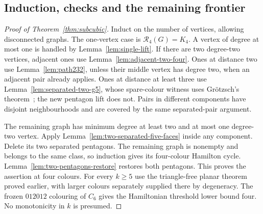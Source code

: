 \documentclass[11pt]{article}
\theoremstyle{remark}
\newcommand{\R}{\mathcal R}
\numberwithin{equation}{section}
\numberwithin{table}{section}
\begin{document}
\subsection{Induction, checks and the remaining frontier}
\begin{proof}[Proof of Theorem~\ref{thm:subcubic}]
Induct on the number of vertices, allowing disconnected graphs.
The one-vertex case is $\R_4(G)=K_4$. A vertex of degree at most one
is handled by Lemma~\ref{lem:single-lift}.
If there are two degree-two vertices, adjacent ones use Lemma~\ref{lem:adjacent-two-four}. Ones at distance two use Lemma~\ref{lem:path232}, unless their
middle vertex has degree two, when an adjacent pair already applies.
Ones at distance at least three use Lemma~\ref{lem:separated-two-g5}, whose spare-colour witness uses
Gr\"otzsch's theorem~\cite{Grotzsch59}; the new pentagon lift does not.
Pairs in different components have disjoint neighbourhoods and
are covered by the same separated-pair argument.

The remaining graph has minimum degree at least two and at most
one degree-two vertex. Apply Lemma~\ref{lem:two-separated-five-faces}
inside any component. Delete its two separated pentagons.
The remaining graph is nonempty and belongs to the same class, so
induction gives its four-colour Hamilton cycle.
Lemma~\ref{lem:two-pentagons-restore} restores both pentagons.
This proves the assertion at four colours.
For every $k\ge5$ use the triangle-free planar theorem proved earlier,
with larger colours separately supplied there by degeneracy.
The frozen $012012$ colouring of $C_6$ gives the Hamiltonian
threshold lower bound four. No monotonicity in $k$ is presumed.
\end{proof}
\end{document}
